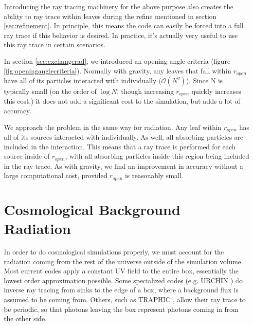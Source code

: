 Introducing the ray tracing machinery for the above purpose also creates the ability to ray trace within leaves during the refine mentioned in section \ref{sec:refinement}. In principle, this means the code can easily be forced into a full ray trace if this behavior is desired. In practice, it's actually very useful to use this ray trace in certain scenarios.

In section \ref{sec:exchangerad}, we introduced an opening angle criteria (figure \ref{fig:openinganglecriteria}). Normally with gravity, any leaves that fall within $r_{open}$ have all of its particles interacted with individually ($\mathcal{O}(N^2)$). Since N is typically small (on the order of $\log{N}$, though increasing $r_{open}$ quickly increases this cost.) it does not add a significant cost to the simulation, but adds a lot of accuracy.

We approach the problem in the same way for radiation. Any leaf within $r_{open}$ has all of its sources interacted with individually. As well, all absorbing particles are included in the interaction. This means that a ray trace is performed for each source inside of $r_{open}$, with all absorbing particles inside this region being included in the ray trace. As with gravity, we find an improvement in accuracy without a large computational cost, provided $r_{open}$ is reasonably small.

%

%

\section{Cosmological Background Radiation}
\label{sec:cosmobackground}

In order to do cosmological simulations properly, we must account for the radiation coming from the rest of the universe outside of the simulation volume. Most current codes apply a constant UV field to the entire box, essentially the lowest order approximation possible. Some specialized codes (e.g. URCHIN \citet{altayTheuns13}) do inverse ray tracing from sinks to the edge of a box, where a background flux is assumed to be coming from. Others, such as TRAPHIC \citep{pawlikSchaye08}, allow their ray trace to be periodic, so that photons leaving the box represent photons coming in from the other side.

